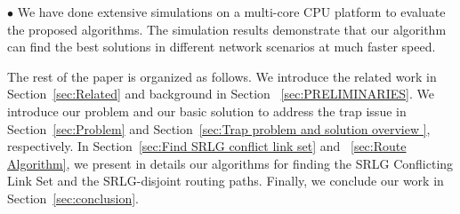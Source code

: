 $\bullet$  We have done extensive simulations on a multi-core CPU platform to evaluate the proposed algorithms. The simulation results demonstrate that our algorithm can find the best solutions in different network scenarios at much faster speed.


The rest of the paper is organized as follows. We introduce the related work in Section~\ref{sec:Related} and background in Section ~\ref{sec:PRELIMINARIES}. We introduce our problem and our basic solution to address the trap issue in Section~\ref{sec:Problem} and Section~\ref{sec:Trap problem and solution overview }, respectively. In Section~\ref{sec:Find SRLG conflict link set} and ~\ref{sec:Route Algorithm}, we present in details our algorithms for finding the SRLG Conflicting Link Set and the SRLG-disjoint routing paths. Finally, we conclude our work in Section~\ref{sec:conclusion}.







